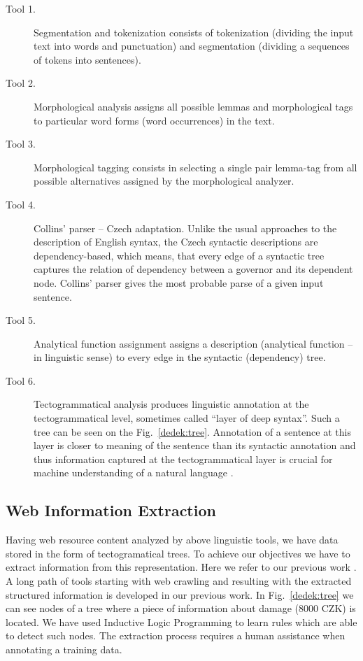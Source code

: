 \documentclass[authoryear,12pt]{elsarticle}
\begin{document}
\begin{description}
 
	\item[Tool 1.] Segmentation and tokenization consists of tokenization
(dividing the input text into words and punctuation)
and segmentation (dividing a sequences of tokens
into sentences).

	\item[Tool 2.] Morphological analysis assigns all possible lemmas
and morphological tags to particular word forms (word
occurrences) in the text.

	\item[Tool 3.] Morphological tagging consists in selecting a single
pair lemma-tag from all possible alternatives assigned
by the morphological analyzer.

	\item[Tool 4.] Collins' parser -- Czech adaptation. 
Unlike the usual approaches to the description of
English syntax, the Czech syntactic descriptions are
dependency-based, which means, that every edge of
a syntactic tree captures the relation of dependency
between a governor and its dependent node. Collins'
parser gives the most probable parse of a given input
sentence.

	\item[Tool 5.] Analytical function assignment assigns a description
(analytical function -- in linguistic sense) to every edge
in the syntactic (dependency) tree.

	\item[Tool 6.] Tectogrammatical analysis produces linguistic annotation
at the tectogrammatical level, sometimes called
``layer of deep syntax''. Such a tree can be seen on
the Fig.~\ref{dedek:tree}. Annotation of a sentence at this layer
is closer to meaning of the sentence than its syntactic
annotation and thus information captured at the tectogrammatical
layer is crucial for machine understanding
of a natural language \citep{dedek:KlTransformationBasedTectogrammatical2006}.
\end{description}


\subsection{Web Information Extraction}

Having web resource content analyzed by above linguistic tools, we have data stored in the form of tectogramatical trees. To achieve our objectives we have to extract information from this representation. 
Here we refer to our previous work \citep{dedek:DeVoComputingaggregations2008,dedek:DeVoLinguisticextraction2008,dedek:DeEcExperimentswith2008}. A long path of tools starting with web crawling and resulting with the extracted structured information is developed in our previous work. 
In Fig.~\ref{dedek:tree} we can see nodes of a tree where a piece of information about damage (8000 CZK) is located. We have used Inductive Logic Programming to learn rules which are able to detect such nodes. 
The extraction process requires a human assistance when annotating a training data.
\end{document}
